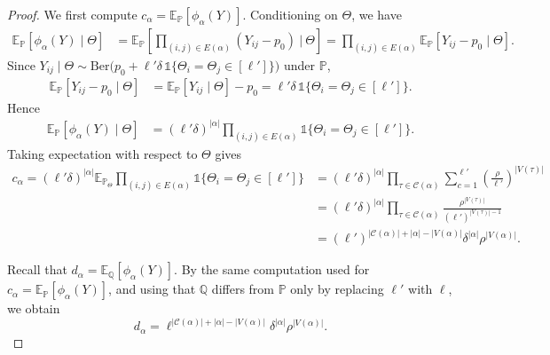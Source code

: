 \documentclass[11pt, letterpaper]{article}
\numberwithin{equation}{section}
\newcommand{\E}{\mathbb{E}}
\newcommand{\PP}{\mathbb{P}}
\newcommand{\QQ}{\mathbb{Q}}
\begin{document}
    \begin{proof} We first compute $c_\alpha=\E_\PP[\phi_\alpha(Y)]$. Conditioning on $\Theta$, we have 
\begin{align*} \mathbb E_{\PP}[\phi_\alpha(Y)\mid \Theta] &=\mathbb E_{\PP} \left[\prod_{(i,j)\in E(\alpha)}(Y_{ij}-p_0)\ \Big|\ \Theta\right] =\prod_{(i,j)\in E(\alpha)}\mathbb E_{\PP}[Y_{ij}-p_0\mid \Theta]. \end{align*} Since $Y_{ij}\mid\Theta\sim\mathrm{Ber} \big(p_0+\ell'\delta\,\mathds 1\{\Theta_i=\Theta_j\in[\ell']\}\big)$ under $\PP$,  \begin{align*} \mathbb E_{\PP}[Y_{ij}-p_0\mid\Theta] &=\mathbb E_{\PP}[Y_{ij}\mid\Theta]-p_0 =\ell'\delta\,\mathds 1\{\Theta_i=\Theta_j\in[\ell']\}. \end{align*} 
%
Hence 
\begin{align*}
\E_{\PP}[\phi_\alpha(Y)\mid \Theta]
&=(\ell'\delta)^{|\alpha|}
\prod_{(i,j)\in E(\alpha)}
\mathds 1\{\Theta_i=\Theta_j\in[\ell']\}.
\end{align*}
Taking expectation with respect to $\Theta$ gives
\begin{align*}
c_\alpha=(\ell'\delta)^{|\alpha|} \E_{\PP_\Theta}\prod_{(i,j)\in E(\alpha)} \mathds 1\{\Theta_i=\Theta_j\in[\ell']\}&=(\ell'\delta)^{|\alpha|}\prod_{\tau \in \mathcal{C}(\alpha)}
\sum_{c=1}^{\ell'}\left(\frac{\rho}{\ell'}\right)^{|V(\tau)|}\\
&=(\ell'\delta)^{|\alpha|}\prod_{\tau \in \mathcal{C}(\alpha)}\frac{\rho^{|V(\tau)|}}{(\ell')^{|V(\tau)|-1}}\\
&=(\ell')^{|\mathcal{C}(\alpha)|+|\alpha|-|V(\alpha)|}\delta^{|\alpha|}\rho^{|V(\alpha)|}.
\end{align*}

\noindent Recall that $d_\alpha=\E_\QQ[\phi_\alpha(Y)]$. By the same computation used for $c_\alpha=\E_\PP[\phi_\alpha(Y)]$, and using that $\QQ$ differs from $\PP$ only by replacing $\ell'$ with $\ell$, we obtain
\[d_\alpha=\ell^{|\mathcal{C}(\alpha)|+|\alpha|-|V(\alpha)|}\delta^{|\alpha|}\rho^{|V(\alpha)|}.\]



\end{proof}
\end{document}
